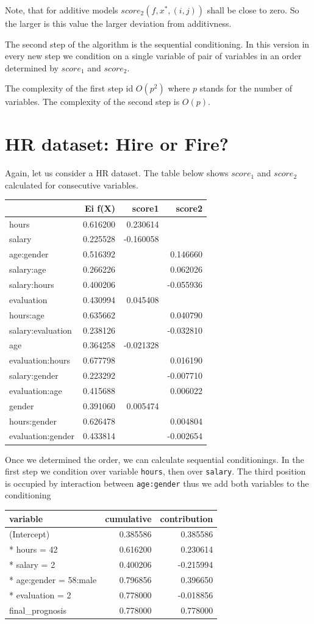 \documentclass[]{book}
\theoremstyle{definition}
\theoremstyle{definition}
\theoremstyle{definition}
\theoremstyle{remark}
\begin{document}
Note, that for additive models \(score_2(f, x^*, (i,j))\) shall be close
to zero. So the larger is this value the larger deviation from
additivness.

The second step of the algorithm is the sequential conditioning. In this
version in every new step we condition on a single variable of pair of
variables in an order determined by \(score_1\) and \(score_2\).

The complexity of the first step id \(O(p^2)\) where \(p\) stands for
the number of variables. The complexity of the second step is \(O(p)\).

\hypertarget{hr-dataset-hire-or-fire-1}{%
\section{HR dataset: Hire or Fire?}\label{hr-dataset-hire-or-fire-1}}

Again, let us consider a HR dataset. The table below shows \(score_1\)
and \(score_2\) calculated for consecutive variables.

\begin{longtable}[]{@{}lrrr@{}}
\toprule
& Ei f(X) & score1 & score2\tabularnewline
\midrule
\endhead
hours & 0.616200 & 0.230614 &\tabularnewline
salary & 0.225528 & -0.160058 &\tabularnewline
age:gender & 0.516392 & & 0.146660\tabularnewline
salary:age & 0.266226 & & 0.062026\tabularnewline
salary:hours & 0.400206 & & -0.055936\tabularnewline
evaluation & 0.430994 & 0.045408 &\tabularnewline
hours:age & 0.635662 & & 0.040790\tabularnewline
salary:evaluation & 0.238126 & & -0.032810\tabularnewline
age & 0.364258 & -0.021328 &\tabularnewline
evaluation:hours & 0.677798 & & 0.016190\tabularnewline
salary:gender & 0.223292 & & -0.007710\tabularnewline
evaluation:age & 0.415688 & & 0.006022\tabularnewline
gender & 0.391060 & 0.005474 &\tabularnewline
hours:gender & 0.626478 & & 0.004804\tabularnewline
evaluation:gender & 0.433814 & & -0.002654\tabularnewline
\bottomrule
\end{longtable}

Once we determined the order, we can calculate sequential conditionings.
In the first step we condition over variable \texttt{hours}, then over
\texttt{salary}. The third position is occupied by interaction between
\texttt{age:gender} thus we add both variables to the conditioning

\begin{longtable}[]{@{}lrr@{}}
\toprule
variable & cumulative & contribution\tabularnewline
\midrule
\endhead
(Intercept) & 0.385586 & 0.385586\tabularnewline
* hours = 42 & 0.616200 & 0.230614\tabularnewline
* salary = 2 & 0.400206 & -0.215994\tabularnewline
* age:gender = 58:male & 0.796856 & 0.396650\tabularnewline
* evaluation = 2 & 0.778000 & -0.018856\tabularnewline
final\_prognosis & 0.778000 & 0.778000\tabularnewline
\bottomrule
\end{longtable}
\end{document}
